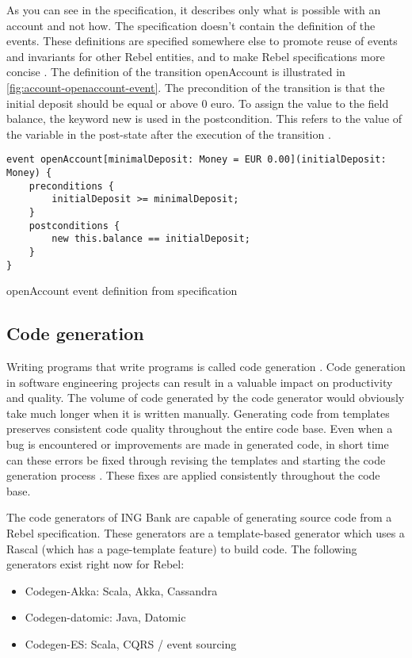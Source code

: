 As you can see in the specification, it describes only what is possible with an account and not how. The specification doesn't contain the definition of the events. These definitions are specified somewhere else to promote reuse of events and invariants for other Rebel entities, and to make Rebel specifications more concise \cite[p.4]{stoel_storm_vinju_bosman_2016}.
The definition of the transition openAccount is illustrated in \autoref{fig:account-openaccount-event}. The precondition of the transition is that the initial deposit should be equal or above 0 euro. To assign the value to the field balance, the keyword new is used in the postcondition. This refers to the value of the variable in the post-state after the execution of the transition \cite[p.4]{stoel_storm_vinju_bosman_2016}.

\begin{sourcecode}[h]
\begin{lstlisting}[]
event openAccount[minimalDeposit: Money = EUR 0.00](initialDeposit: Money) {
	preconditions {
		initialDeposit >= minimalDeposit;
	}
	postconditions {
		new this.balance == initialDeposit;
	}  
}
\end{lstlisting}
\caption{openAccount event definition from specification}
\label{fig:account-openaccount-event}
\end{sourcecode}

\subsection{Code generation}

Writing programs that write programs is called code generation \cite[p.3]{herrington2003code}. Code generation in software engineering projects can result in a valuable impact on productivity and quality. The volume of code generated by the code generator would obviously take much longer when it is written manually. Generating code from templates preserves consistent code quality throughout the entire code base. Even when a bug is encountered or improvements are made in generated code, in short time can these errors be fixed through revising the templates and starting the code generation process \cite[p.15-17]{herrington2003code}. These fixes are applied consistently throughout the code base. 

The code generators of ING Bank are capable of generating source code from a Rebel specification. These generators are a template-based generator which uses a Rascal (which has a page-template feature)\cite{RascalGTTSE} to build code. The following generators exist right now for Rebel: 
\begin{itemize}
\item Codegen-Akka: Scala, Akka, Cassandra
\item Codegen-datomic: Java, Datomic
\item Codegen-ES: Scala, CQRS / event sourcing
\end{itemize}

